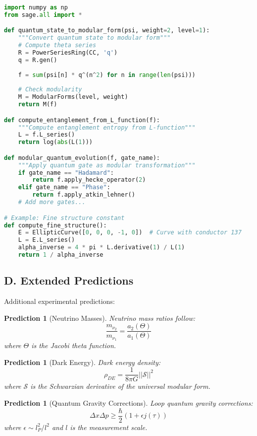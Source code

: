\documentclass[12pt,a4paper]{article}
\newtheorem{prediction}[theorem]{Prediction}
\begin{document}
\begin{lstlisting}[language=Python]
import numpy as np
from sage.all import *

def quantum_state_to_modular_form(psi, weight=2, level=1):
    """Convert quantum state to modular form"""
    # Compute theta series
    R = PowerSeriesRing(CC, 'q')
    q = R.gen()
    
    f = sum(psi[n] * q^(n^2) for n in range(len(psi)))
    
    # Check modularity
    M = ModularForms(level, weight)
    return M(f)

def compute_entanglement_from_L_function(f):
    """Compute entanglement entropy from L-function"""
    L = f.L_series()
    return log(abs(L(1)))

def modular_quantum_evolution(f, gate_name):
    """Apply quantum gate as modular transformation"""
    if gate_name == "Hadamard":
        return f.apply_hecke_operator(2)
    elif gate_name == "Phase":
        return f.apply_atkin_lehner()
    # Add more gates...

# Example: Fine structure constant
def compute_fine_structure():
    E = EllipticCurve([0, 0, 0, -1, 0])  # Curve with conductor 137
    L = E.L_series()
    alpha_inverse = 4 * pi * L.derivative(1) / L(1)
    return 1 / alpha_inverse
\end{lstlisting}

\subsection{D. Extended Predictions}

Additional experimental predictions:

\begin{prediction}[Neutrino Masses]
Neutrino mass ratios follow:
\[
\frac{m_{\nu_2}}{m_{\nu_1}} = \frac{a_2(\Theta)}{a_1(\Theta)}
\]
where $\Theta$ is the Jacobi theta function.
\end{prediction}

\begin{prediction}[Dark Energy]
Dark energy density:
\[
\rho_{DE} = \frac{1}{8\pi G} ||\mathcal{S}||^2
\]
where $\mathcal{S}$ is the Schwarzian derivative of the universal modular form.
\end{prediction}

\begin{prediction}[Quantum Gravity Corrections]
Loop quantum gravity corrections:
\[
\Delta x \Delta p \geq \frac{\hbar}{2}(1 + \epsilon j(\tau))
\]
where $\epsilon \sim l_P^2/l^2$ and $l$ is the measurement scale.
\end{prediction}
\end{document}

